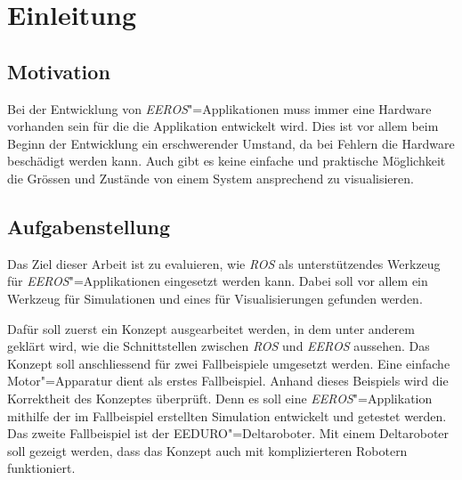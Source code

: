 \chapter{Einleitung}
\section{Motivation}


Bei der Entwicklung von \textit{EEROS}"=Applikationen muss immer eine Hardware vorhanden sein für die die Applikation entwickelt wird.
Dies ist vor allem beim Beginn der Entwicklung ein erschwerender Umstand, da bei Fehlern die Hardware beschädigt werden kann.
Auch gibt es keine einfache und praktische Möglichkeit die Grössen und Zustände von einem System ansprechend zu visualisieren.


\section{Aufgabenstellung}
Das Ziel dieser Arbeit ist zu evaluieren, wie \textit{ROS} als unterstützendes Werkzeug für \textit{EEROS}"=Applikationen eingesetzt werden kann.
Dabei soll vor allem ein Werkzeug für Simulationen und eines für Visualisierungen gefunden werden.

Dafür soll zuerst ein Konzept ausgearbeitet werden, in dem unter anderem geklärt wird, wie die Schnittstellen zwischen \textit{ROS} und \textit{EEROS} aussehen.
Das Konzept soll anschliessend für zwei Fallbeispiele umgesetzt werden.
Eine einfache Motor"=Apparatur dient als erstes Fallbeispiel.
Anhand dieses Beispiels wird die Korrektheit des Konzeptes überprüft.
Denn es soll eine \textit{EEROS}"=Applikation mithilfe der im Fallbeispiel erstellten Simulation entwickelt und getestet werden.
Das zweite Fallbeispiel ist der EEDURO"=Deltaroboter.
Mit einem Deltaroboter soll gezeigt werden, dass das Konzept auch mit komplizierteren Robotern funktioniert.

